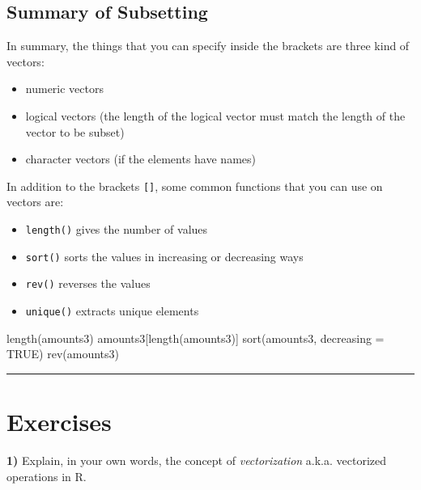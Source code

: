 \documentclass[
]{book}
\newenvironment{Shaded}{\begin{snugshade}}{\end{snugshade}}
\newcommand{\AttributeTok}[1]{\textcolor[rgb]{0.77,0.63,0.00}{#1}}
\newcommand{\ConstantTok}[1]{\textcolor[rgb]{0.00,0.00,0.00}{#1}}
\newcommand{\FunctionTok}[1]{\textcolor[rgb]{0.00,0.00,0.00}{#1}}
\newcommand{\NormalTok}[1]{#1}
\providecommand{\tightlist}{%
  \setlength{\itemsep}{0pt}\setlength{\parskip}{0pt}}
\begin{document}
\hypertarget{summary-of-subsetting}{%
\subsection{Summary of Subsetting}\label{summary-of-subsetting}}

In summary, the things that you can specify inside the brackets are three
kind of vectors:

\begin{itemize}
\item
  numeric vectors
\item
  logical vectors (the length of the logical vector must match the length
  of the vector to be subset)
\item
  character vectors (if the elements have names)
\end{itemize}

In addition to the brackets \texttt{{[}{]}}, some common functions that you can use on
vectors are:

\begin{itemize}
\tightlist
\item
  \texttt{length()} gives the number of values
\item
  \texttt{sort()} sorts the values in increasing or decreasing ways
\item
  \texttt{rev()} reverses the values
\item
  \texttt{unique()} extracts unique elements
\end{itemize}

\begin{Shaded}
\begin{Highlighting}[]
\FunctionTok{length}\NormalTok{(amounts3)}
\NormalTok{amounts3[}\FunctionTok{length}\NormalTok{(amounts3)]}
\FunctionTok{sort}\NormalTok{(amounts3, }\AttributeTok{decreasing =} \ConstantTok{TRUE}\NormalTok{)}
\FunctionTok{rev}\NormalTok{(amounts3)}
\end{Highlighting}
\end{Shaded}

\begin{center}\rule{0.5\linewidth}{0.5pt}\end{center}

\hypertarget{exercises-3}{%
\section{Exercises}\label{exercises-3}}

\textbf{1)} Explain, in your own words, the concept of \emph{vectorization} a.k.a.
vectorized operations in R.
\end{document}
